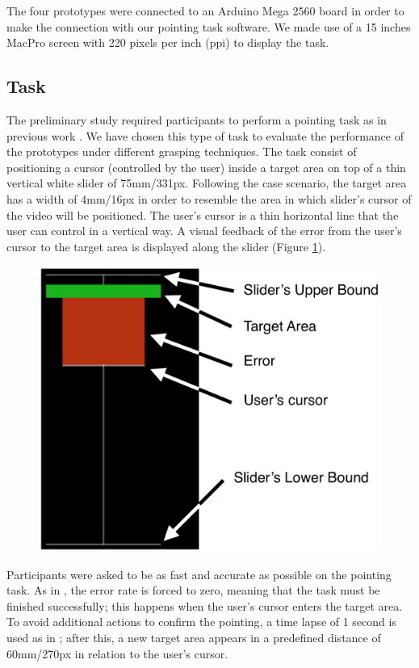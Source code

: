 \documentclass{sigchi}
\begin{document}
The four prototypes were connected to an Arduino Mega 2560 board in order to make the connection with our pointing task software. We made use of a 15 inches MacPro screen with 220 pixels per inch (ppi) to display the task.

\subsection{Task}
The preliminary study required participants to perform a pointing task as in previous work \cite{Buck:Motor}. We have chosen this type of task to evaluate the performance of the prototypes under different grasping techniques. The task consist of positioning a cursor (controlled by the user) inside a target area on top of a thin vertical white slider of 75mm/331px. Following the case scenario, the target area has a width of 4mm/16px in order to resemble the area in which slider’s cursor of the video will be positioned. The user’s cursor is a thin horizontal line that the user can control in a vertical way. A visual feedback of the error from the user’s cursor to the target area is displayed along the slider (Figure \ref{fig:slidertask}).

\begin{figure}[h]
\centering
  \includegraphics[width=0.7\columnwidth]{figures/slidertask}
  \caption{}
  \label{fig:slidertask}
\end{figure}

Participants were asked to be as fast and accurate as possible on the pointing task. As in \cite{Buck:Motor}, the error rate is forced to zero, meaning that the task must be finished successfully; this happens when the user’s cursor enters the target area. To avoid additional actions to confirm the pointing, a time lapse of 1 second is used as in \cite{Zhang:2012:MDE:2212776.2223704}; after this, a new target area appears in a predefined distance of 60mm/270px in relation to the user’s cursor.
\end{document}
